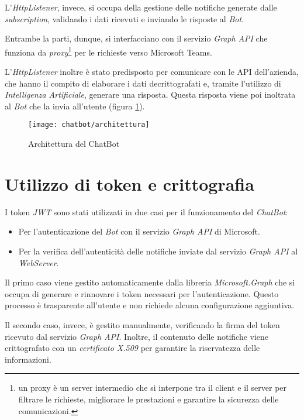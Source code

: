 L'\emph{HttpListener}, invece, si occupa della gestione delle notifiche generate dalle \emph{subscription}, validando i dati ricevuti e inviando le risposte al \emph{Bot}.

Entrambe la parti, dunque, si interfacciano con il servizio \emph{Graph API} che funziona da \emph{proxy}\footnote{un proxy è un server intermedio che si interpone tra il client e il server per filtrare le richieste, migliorare le prestazioni e garantire la sicurezza delle comunicazioni.} per le richieste verso Microsoft Teams.

L'\emph{HttpListener} inoltre è stato predisposto per comunicare con le API dell'azienda, che hanno il compito di elaborare i dati decrittografati e, tramite l'utilizzo di \emph{Intelligenza Artificiale}, generare una risposta.
Questa risposta viene poi inoltrata al \emph{Bot} che la invia all'utente (figura \ref{fig:arch-bot}).

\begin{figure}[!ht] 
    \centering 
    \texttt{[image: chatbot/architettura]} 
    \caption{Architettura del ChatBot}
	\label{fig:arch-bot}
\end{figure}

\section{Utilizzo di token e crittografia}

I token \emph{JWT} sono stati utilizzati in due casi per il funzionamento del \emph{ChatBot}:
\begin{itemize}
	\item Per l'autenticazione del \emph{Bot} con il servizio \emph{Graph API} di Microsoft.
	\item Per la verifica dell'autenticità delle notifiche inviate dal servizio \emph{Graph API} al \emph{WebServer}.
\end{itemize}

Il primo caso viene gestito automaticamente dalla libreria \emph{Microsoft.Graph} che si occupa di generare e rinnovare i token necessari per l'autenticazione.
Questo processo è trasparente all'utente e non richiede alcuna configurazione aggiuntiva.

Il secondo caso, invece, è gestito manualmente, verificando la firma del token ricevuto dal servizio \emph{Graph API}.
Inoltre, il contenuto delle notifiche viene crittografato con un \emph{certificato \gls{X.509}} per garantire la riservatezza delle informazioni.

